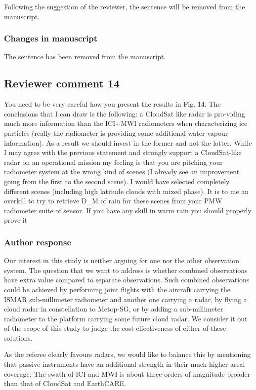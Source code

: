 Following the suggestion of the reviewer, the sentence will be removed from the manuscript.

\subsubsection*{Changes in manuscript}

The sentence has been removed from the manuscript.

\subsection*{Reviewer comment 14}
You need to be very careful how you present the results in Fig. 14. The
conclusions that I can draw is the following: a CloudSat like radar is
pro-viding much more information than the ICI+MWI radiometers when
characterizing ice particles (really the radiometer is providing some additional
water vapour information). As a result we should invest in the former and not the
latter. While I may agree with the previous statement and strongly support a
CloudSat-like radar on an operational mission my feeling is that you are
pitching your radiometer system at the wrong kind of scenes (I already see an
improvement going from the first to the second scene). I would have selected
completely different scenes (including high latitude clouds with mixed phase). It
is to me an overkill to try to retrieve D\_M of rain for these scenes from your
PMW radiometer suite of sensor. If you have any skill in warm rain you
should properly prove it

\subsubsection*{Author response}

Our interest in this study is neither arguing for one nor the other observation
system. The question that we want to address is whether combined observations
have extra value compared to separate observations. Such combined observations
could be achieved by performing joint flights with the aircraft carrying the
ISMAR sub-millimeter radiometer and another one carrying a radar, by flying a
cloud radar in constellation to Metop-SG, or by adding a sub-millimeter
radiometer to the platform carrying some future cloud radar. We consider it out
of the scope of this study to judge the cost effectiveness of either of these
solutions.

As the referee clearly favours radars, we would like to balance this by mentioning that
passive instruments have an additional strength in their much higher areal coverage. The
swath of ICI and MWI is about three orders of magnitude broader than that of CloudSat
and EarthCARE.

